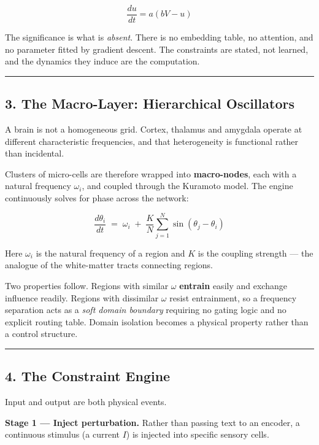 \documentclass[
  11pt,
  a4paper,
]{article}
\begin{document}
\[
\frac{du}{dt} = a(bV - u)
\]

The significance is what is \emph{absent}. There is no embedding table,
no attention, and no parameter fitted by gradient descent. The
constraints are stated, not learned, and the dynamics they induce are
the computation.

\begin{center}\rule{0.5\linewidth}{0.5pt}\end{center}

\subsection{3. The Macro-Layer: Hierarchical
Oscillators}\label{the-macro-layer-hierarchical-oscillators}

A brain is not a homogeneous grid. Cortex, thalamus and amygdala operate
at different characteristic frequencies, and that heterogeneity is
functional rather than incidental.

Clusters of micro-cells are therefore wrapped into \textbf{macro-nodes},
each with a natural frequency \(\omega_i\), and coupled through the
Kuramoto model. The engine continuously solves for phase across the
network:

\[
\frac{d\theta_i}{dt} \;=\; \omega_i \;+\; \frac{K}{N}\sum_{j=1}^{N} \sin(\theta_j - \theta_i)
\]

Here \(\omega_i\) is the natural frequency of a region and \(K\) is the
coupling strength --- the analogue of the white-matter tracts connecting
regions.

Two properties follow. Regions with similar \(\omega\) \textbf{entrain}
easily and exchange influence readily. Regions with dissimilar
\(\omega\) resist entrainment, so a frequency separation acts as a
\emph{soft domain boundary} requiring no gating logic and no explicit
routing table. Domain isolation becomes a physical property rather than
a control structure.

\begin{center}\rule{0.5\linewidth}{0.5pt}\end{center}

\subsection{4. The Constraint Engine}\label{the-constraint-engine}

Input and output are both physical events.

\textbf{Stage 1 --- Inject perturbation.} Rather than passing text to an
encoder, a continuous stimulus (a current \(I\)) is injected into
specific sensory cells.
\end{document}
